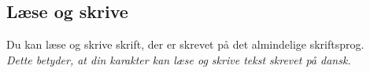 \subsection{Læse og skrive}
Du kan læse og skrive skrift, der er skrevet på det almindelige skriftsprog.\\
\textit{Dette betyder, at din karakter kan læse og skrive tekst skrevet på dansk.}\\